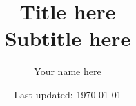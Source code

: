 \documentclass[letterpaper, 12pt]{article}
\begin{document}
\title{Title here \\[1em] \normalsize Subtitle here}
\author{\normalsize Your name here}
\date{\normalsize\vspace{-1ex} Last updated: \today}

\maketitle
\tableofcontents
\label{sec:contents}





\end{document}
